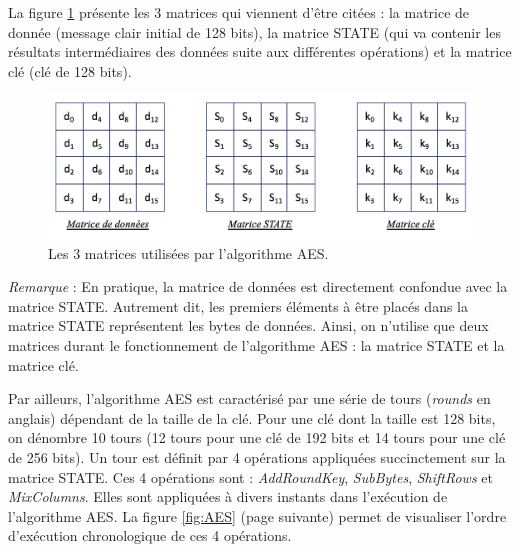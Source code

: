 \documentclass[10pt, oneside, a4paper]{article}
\begin{document}
La figure \ref{fig:matrix} présente les 3 matrices qui viennent d'être citées : la matrice de donnée (message clair initial de 128 bits), la matrice STATE (qui va contenir les résultats intermédiaires des données suite aux différentes opérations) et la matrice clé (clé de 128 bits).
\begin{figure}[htbp]
    \centering
    \includegraphics[scale=0.75]{image/matrix}
    \caption{Les 3 matrices utilisées par l'algorithme AES.}
    \label{fig:matrix}
\end{figure}

\textit{Remarque} : En pratique, la matrice de données est directement confondue avec la matrice STATE. Autrement dit, les premiers éléments à être placés dans la matrice STATE représentent les bytes de données. Ainsi, on n'utilise que deux matrices durant le fonctionnement de l'algorithme AES : la matrice STATE et la matrice clé.

Par ailleurs, l'algorithme AES est caractérisé par une série de tours (\textit{rounds} en anglais) dépendant de la taille de la clé. Pour une clé dont la taille est 128 bits, on dénombre 10 tours (12 tours pour une clé de 192 bits et 14 tours pour une clé de 256 bits). Un tour est définit par 4 opérations appliquées succinctement sur la matrice STATE. Ces 4 opérations sont : \textit{AddRoundKey}, \textit{SubBytes}, \textit{ShiftRows} et \textit{MixColumns}. Elles sont appliquées à divers instants dans l'exécution de l'algorithme AES. La figure \ref{fig:AES} (page suivante) permet de visualiser l'ordre d'exécution chronologique de ces 4 opérations. 

\newpage
\end{document}
